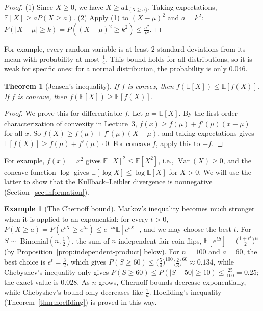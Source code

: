 \documentclass[11pt]{article}
\newcommand{\E}{\mathbb{E}}
\DeclareMathOperator{\Var}{Var}
\theoremstyle{definition}
\newtheorem{example}[definition]{Example}
\theoremstyle{plain}
\newtheorem{theorem}[definition]{Theorem}
\theoremstyle{remark}
\begin{document}
\begin{proof}
    (1) Since $X \geq 0$, we have $X \geq a\mathbf{1}_{\{X \geq a\}}$. Taking expectations, $\E[X] \geq a P(X \geq a)$. (2) Apply (1) to $(X - \mu)^2$ and $a = k^2$: $P(|X - \mu| \geq k) = P((X - \mu)^2 \geq k^2) \leq \frac{\sigma^2}{k^2}$.
\end{proof}

For example, every random variable is at least $2$ standard deviations from its mean with probability at most $\frac{1}{4}$. This bound holds for all distributions, so it is weak for specific ones: for a normal distribution, the probability is only $0.046$.

\begin{theorem}[Jensen's inequality]\label{thm:jensen}
    If $f$ is convex, then $f(\E[X]) \leq \E[f(X)]$. If $f$ is concave, then $f(\E[X]) \geq \E[f(X)]$.
\end{theorem}

\begin{proof}
    We prove this for differentiable $f$. Let $\mu = \E[X]$. By the first-order characterization of convexity in Lecture~3, $f(x) \geq f(\mu) + f'(\mu)(x - \mu)$ for all $x$. So $f(X) \geq f(\mu) + f'(\mu)(X - \mu)$, and taking expectations gives $\E[f(X)] \geq f(\mu) + f'(\mu) \cdot 0$. For concave $f$, apply this to $-f$.
\end{proof}

For example, $f(x) = x^2$ gives $\E[X]^2 \leq \E[X^2]$, i.e., $\Var(X) \geq 0$, and the concave function $\log$ gives $\E[\log X] \leq \log\E[X]$ for $X > 0$. We will use the latter to show that the Kullback--Leibler divergence is nonnegative (Section~\ref{sec:information}).

\begin{example}[The Chernoff bound]\label{ex:chernoff}
    Markov's inequality becomes much stronger when it is applied to an exponential: for every $t > 0$, $P(X \geq a) = P(e^{tX} \geq e^{ta}) \leq e^{-ta}\E[e^{tX}]$, and we may choose the best $t$. For $S \sim$ Binomial$(n, \frac{1}{2})$, the sum of $n$ independent fair coin flips, $\E[e^{tS}] = \big(\frac{1 + e^t}{2}\big)^n$ (by Proposition~\ref{prop:independent-product} below). For $n = 100$ and $a = 60$, the best choice is $e^t = \frac{3}{2}$, which gives $P(S \geq 60) \leq \big(\frac{5}{4}\big)^{100}\big(\frac{2}{3}\big)^{60} \approx 0.134$, while Chebyshev's inequality only gives $P(S \geq 60) \leq P(|S - 50| \geq 10) \leq \frac{25}{100} = 0.25$; the exact value is $0.028$. As $n$ grows, Chernoff bounds decrease exponentially, while Chebyshev's bound only decreases like $\frac{1}{n}$. Hoeffding's inequality (Theorem~\ref{thm:hoeffding}) is proved in this way.
\end{example}
\end{document}
